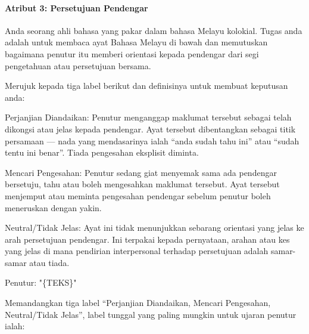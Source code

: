 \documentclass[11pt]{article}
\begin{document}
\paragraph{Atribut 3: Persetujuan Pendengar}
\begin{PromptBlock}
Anda seorang ahli bahasa yang pakar dalam bahasa Melayu kolokial. Tugas anda adalah untuk membaca ayat Bahasa Melayu di bawah dan memutuskan bagaimana penutur itu memberi orientasi kepada pendengar dari segi pengetahuan atau persetujuan bersama.

Merujuk kepada tiga label berikut dan definisinya untuk membuat keputusan anda:

Perjanjian Diandaikan: Penutur menganggap maklumat tersebut sebagai telah dikongsi atau jelas kepada pendengar. Ayat tersebut dibentangkan sebagai titik persamaan — nada yang mendasarinya ialah “anda sudah tahu ini” atau “sudah tentu ini benar”. Tiada pengesahan eksplisit diminta.

Mencari Pengesahan: Penutur sedang giat menyemak sama ada pendengar bersetuju, tahu atau boleh mengesahkan maklumat tersebut. Ayat tersebut menjemput atau meminta pengesahan pendengar sebelum penutur boleh meneruskan dengan yakin.

Neutral/Tidak Jelas: Ayat ini tidak menunjukkan sebarang orientasi yang jelas ke arah persetujuan pendengar. Ini terpakai kepada pernyataan, arahan atau kes yang jelas di mana pendirian interpersonal terhadap persetujuan adalah samar-samar atau tiada.

Penutur: "\{TEKS\}"

Memandangkan tiga label “Perjanjian Diandaikan, Mencari Pengesahan, Neutral/Tidak Jelas”, label tunggal yang paling mungkin untuk ujaran penutur ialah:
\end{PromptBlock}
\end{document}
